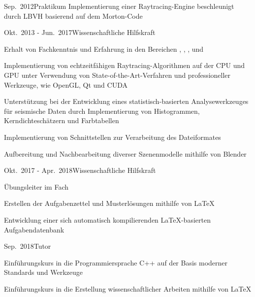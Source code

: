 \documentclass[a4paper,8pt]{cv}
\begin{document}
      \begin{cvTimeItem}{Sep.~2012}{Praktikum}
        Implementierung einer Raytracing-Engine beschleunigt durch LBVH basierend auf dem Morton-Code
      \end{cvTimeItem}
      \begin{cvTimeItem}{Okt.~2013 - Jun.~2017}{Wissenschaftliche Hilfskraft}
        \begin{cvItemize}
          \item Erhalt von Fachkenntnis und Erfahrung in den Bereichen , , ,  und 
          \item Implementierung von echtzeitfähigen Raytracing-Algorithmen auf der CPU und GPU unter Verwendung von State-of-the-Art-Verfahren und professioneller Werkzeuge, wie OpenGL, Qt und CUDA
          \item Unterstützung bei der Entwicklung eines statistisch-basierten Analysewerkzeuges für seismische Daten durch Implementierung von Histogrammen, Kerndichteschätzern und Farbtabellen
          \item Implementierung von Schnittstellen zur Verarbeitung des  Dateiformates
          \item Aufbereitung und Nachbearbeitung diverser Szenenmodelle mithilfe von Blender
        \end{cvItemize}
      \end{cvTimeItem}

      \begin{cvTimeItem}{Okt.~2017 - Apr.~2018}{Wissenschaftliche Hilfskraft}
        \begin{cvItemize}
          \item Übungsleiter im Fach 
          \item Erstellen der Aufgabenzettel und Musterlösungen mithilfe von LaTeX
          \item Entwicklung einer sich automatisch kompilierenden LaTeX-basierten Aufgabendatenbank
        \end{cvItemize}
      \end{cvTimeItem}
      \begin{cvTimeItem}{Sep.~2018}{Tutor}
        \begin{cvItemize}
          \item Einführungskurs in die Programmiersprache C++ auf der Basis moderner Standards und Werkzeuge
          \item Einführungskurs in die Erstellung wissenschaftlicher Arbeiten mithilfe von LaTeX
        \end{cvItemize}
      \end{cvTimeItem}
\end{document}
